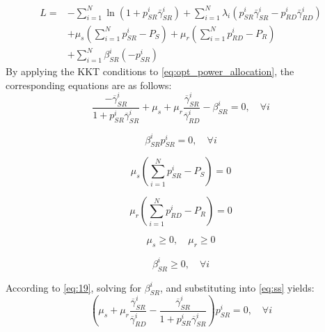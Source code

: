 \documentclass[lettersize,journal]{IEEEtran}
\begin{document}
	\begin{equation}
		\begin{aligned}
			L = & - \sum_{i=1}^{N} \ln(1 + p_{SR}^i \bar{\gamma}_{SR}^i) + \sum_{i=1}^{N} \lambda_i (p_{SR}^i \bar{\gamma}_{SR}^i - p_{RD}^i \bar{\gamma}_{RD}^i) \\
			& + \mu_s \left( \sum_{i=1}^{N} p_{SR}^i - P_S \right) + \mu_r \left( \sum_{i=1}^{N} p_{RD}^i - P_R \right) \\
			& + \sum_{i=1}^{N} \beta_{SR}^i (- p_{SR}^i)
		\end{aligned}
	\end{equation}
	By applying the KKT conditions to \eqref{eq:opt_power_allocation}, the corresponding equations are as follows:
	\begin{equation}
		\frac{- \overline{\gamma}_{SR}^i}{1 + p_{SR}^i \overline{\gamma}_{SR}^i} + \mu_s + \mu_r \frac{\overline{\gamma}_{SR}^i}{\overline{\gamma}_{RD}^i} - \beta_{SR}^i = 0, \quad \forall i
		\label{eq:19}
	\end{equation}
	
	\begin{equation}
		\beta_{SR}^i p_{SR}^i = 0, \quad \forall i
		\label{eq:ss}
	\end{equation}
	
	\begin{equation}
		\mu_s \left( \sum_{i=1}^{N} p_{SR}^i - P_S \right) = 0
		\label{eq:21}
	\end{equation}
	
	\begin{equation}
		\mu_r \left( \sum_{i=1}^{N} p_{RD}^i - P_R \right) = 0
		\label{eq:22}
	\end{equation}
	
	\begin{equation}
		\mu_s \geq 0, \quad \mu_r \geq 0
		\label{eq:23}
	\end{equation}
	
	\begin{equation}
		\beta_{SR}^i \geq 0, \quad \forall i
		\label{eq:24}
	\end{equation}
	
	According to \eqref{eq:19}, solving for \( \beta_{SR}^i \), and substituting into \eqref{eq:ss} yields:
	\begin{equation}
		\left( \mu_s + \mu_r \frac{\overline{\gamma}_{SR}^i}{\overline{\gamma}_{RD}^i} - \frac{\overline{\gamma}_{SR}^i}{1 + p_{SR}^i \overline{\gamma}_{SR}^i} \right) p_{SR}^i = 0, \quad \forall i
		\label{eq:25}
	\end{equation}
	
\end{document}
